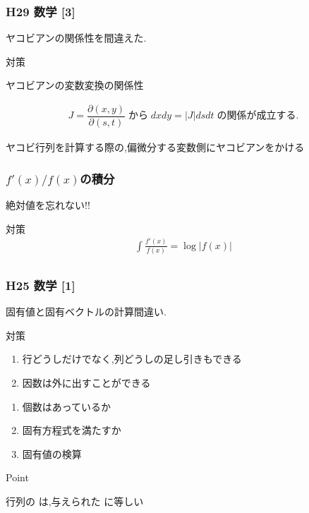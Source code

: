\documentclass[a4paper]{jsarticle}
\begin{document}
\subsubsection{H29 数学 [3]}
ヤコビアンの関係性を間違えた.
\begin{itembox}[l]{対策}
    \begin{center}
        ヤコビアンの変数変換の関係性
    \end{center}
    \begin{eqnarray*}
        J=\dfrac{\partial \left(x,y\right)}{\partial \left(s,t\right)}\; から\; dxdy=|J|dsdt\; の関係が成立する.
    \end{eqnarray*}
    \begin{center}
        ヤコビ行列を計算する際の,偏微分する変数側にヤコビアンをかける
    \end{center}
\end{itembox}
\subsubsection{$f'\left(x\right)/f\left(x\right)$の積分}
絶対値を忘れない!!
\begin{itembox}[l]{対策}
    \begin{eqnarray*}
        \displaystyle\int\frac{f'\left(x\right)}{f\left(x\right)}=\log \left|f\left(x\right)\right|\\
    \end{eqnarray*}
\end{itembox}
\subsubsection{H25 数学 [1]}
固有値と固有ベクトルの計算間違い.
\begin{itembox}[l]{対策}
    \begin{enumerate}[(1)]
        \item 行どうしだけでなく,列どうしの足し引きもできる
        \item 因数は外に出すことができる
    \end{enumerate}
    \begin{enumerate}[(1)]
        \item 個数はあっているか
        \item 固有方程式を満たすか
        \item 固有値の検算
    \end{enumerate}
\end{itembox}
\begin{itembox}[l]{Point}
    \begin{center}
        行列の は,与えられた に等しい
    \end{center}
\end{itembox}
\end{document}
